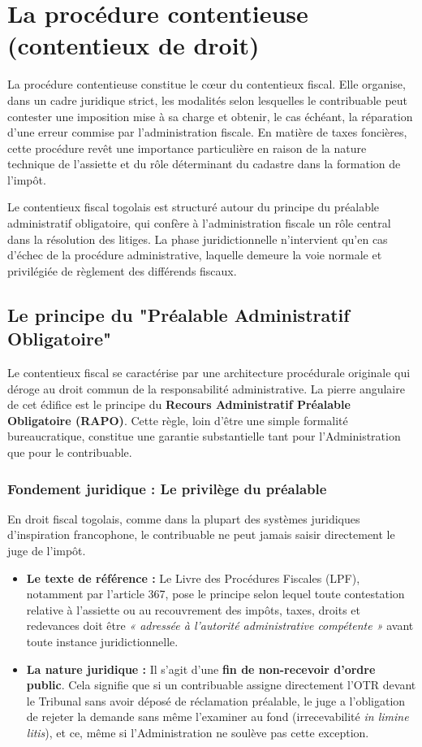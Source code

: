 \documentclass[Cours_contentieuxTF2026.tex]{subfiles}
\begin{document}
\chapter{La procédure contentieuse (contentieux de droit)}

La procédure contentieuse constitue le cœur du contentieux fiscal. Elle organise,
dans un cadre juridique strict, les modalités selon lesquelles le contribuable peut
contester une imposition mise à sa charge et obtenir, le cas échéant, la réparation
d’une erreur commise par l’administration fiscale. En matière de taxes foncières,
cette procédure revêt une importance particulière en raison de la nature technique
de l’assiette et du rôle déterminant du cadastre dans la formation de l’impôt.

Le contentieux fiscal togolais est structuré autour du principe du préalable
administratif obligatoire, qui confère à l’administration fiscale un rôle central dans
la résolution des litiges. La phase juridictionnelle n’intervient qu’en cas d’échec de la
procédure administrative, laquelle demeure la voie normale et privilégiée de
règlement des différends fiscaux.

\section{Le principe du "Préalable Administratif Obligatoire"}

Le contentieux fiscal se caractérise par une architecture procédurale originale qui déroge au droit commun de la responsabilité administrative. La pierre angulaire de cet édifice est le principe du \textbf{Recours Administratif Préalable Obligatoire (RAPO)}. Cette règle, loin d'être une simple formalité bureaucratique, constitue une garantie substantielle tant pour l'Administration que pour le contribuable.

\subsection{Fondement juridique : Le privilège du préalable}
En droit fiscal togolais, comme dans la plupart des systèmes juridiques d'inspiration francophone, le contribuable ne peut jamais saisir directement le juge de l'impôt.

\begin{itemize}
	\item \textbf{Le texte de référence :} Le Livre des Procédures Fiscales (LPF), notamment par l’article 367, pose le principe selon lequel toute contestation relative à l'assiette ou au recouvrement des impôts, taxes, droits et redevances doit être \textit{« adressée à l'autorité administrative compétente »} avant toute instance juridictionnelle.
	
	\item \textbf{La nature juridique :} Il s'agit d'une \textbf{fin de non-recevoir d'ordre public}. Cela signifie que si un contribuable assigne directement l'OTR devant le Tribunal sans avoir déposé de réclamation préalable, le juge a l'obligation de rejeter la demande sans même l'examiner au fond (irrecevabilité \textit{in limine litis}), et ce, même si l'Administration ne soulève pas cette exception.
\end{itemize}
\end{document}
